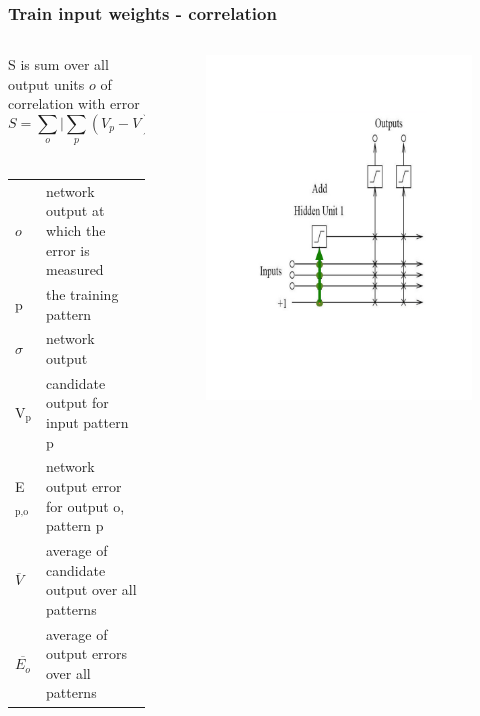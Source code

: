 \documentclass[presentation]{beamer}
\begin{document}
\begin{frame}
  \frametitle{Train input weights - correlation}
	\begin{columns}[t]
		\begin{column}[t]{0.5\textwidth}
      \small{S is sum over all output units $\mathit{o}$ of correlation with error}
      $$ S = \sum_{o} \lvert \sum_{p} (V_{p} - V) (E_{p,o} - E_{o}) \rvert $$
     \\  
      \begin{center}
        \begin{tabular}{ll}
          \(\mathit{o}\) & \tiny{network output at which the error is measured} \\
          p & \tiny{the training pattern} \\
          \(\sigma\) & \tiny{network output} \\
          V\(_{\text{p}}\) & \tiny{candidate output for input pattern p}   \\
          E\(_{\text{p,o}}\) & \tiny{network output error for output o, pattern p} \\
          \(\overline{V}\) & \tiny{average of candidate output over all patterns} \\
          \(\overline{E_{o}}\) & \tiny{average of output errors over all patterns} \\
        \end{tabular}
      \end{center}
		\end{column}
		\begin{column}{0.5\textwidth}
      \begin{figure}
        \centering
        \includegraphics[scale=0.28]{trainInputunit.png}

\end{figure}
\end{column}
\end{columns}
\end{frame}
\end{document}

